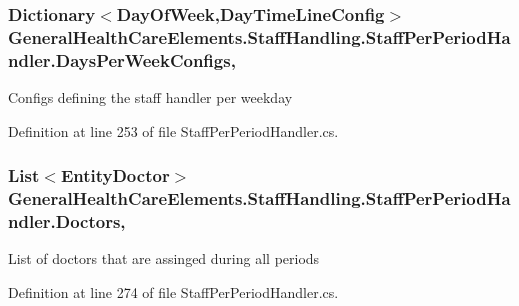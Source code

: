 \subsubsection[{\texorpdfstring{Days\+Per\+Week\+Configs}{DaysPerWeekConfigs}}]{\setlength{\rightskip}{0pt plus 5cm}Dictionary$<$Day\+Of\+Week,{\bf Day\+Time\+Line\+Config}$>$ General\+Health\+Care\+Elements.\+Staff\+Handling.\+Staff\+Per\+Period\+Handler.\+Days\+Per\+Week\+Configs\hspace{0.3cm}{\ttfamily [get]}, {\ttfamily [set]}}\hypertarget{class_general_health_care_elements_1_1_staff_handling_1_1_staff_per_period_handler_ac94366c624e3b094edaa66c35f7d8a65}{}\label{class_general_health_care_elements_1_1_staff_handling_1_1_staff_per_period_handler_ac94366c624e3b094edaa66c35f7d8a65}


Configs defining the staff handler per weekday 



Definition at line 253 of file Staff\+Per\+Period\+Handler.\+cs.

\subsubsection[{\texorpdfstring{Doctors}{Doctors}}]{\setlength{\rightskip}{0pt plus 5cm}List$<${\bf Entity\+Doctor}$>$ General\+Health\+Care\+Elements.\+Staff\+Handling.\+Staff\+Per\+Period\+Handler.\+Doctors\hspace{0.3cm}{\ttfamily [get]}, {\ttfamily [set]}}\hypertarget{class_general_health_care_elements_1_1_staff_handling_1_1_staff_per_period_handler_ac0a52f1fe17fbbedaa8bc2ec383bc858}{}\label{class_general_health_care_elements_1_1_staff_handling_1_1_staff_per_period_handler_ac0a52f1fe17fbbedaa8bc2ec383bc858}


List of doctors that are assinged during all periods 



Definition at line 274 of file Staff\+Per\+Period\+Handler.\+cs.

